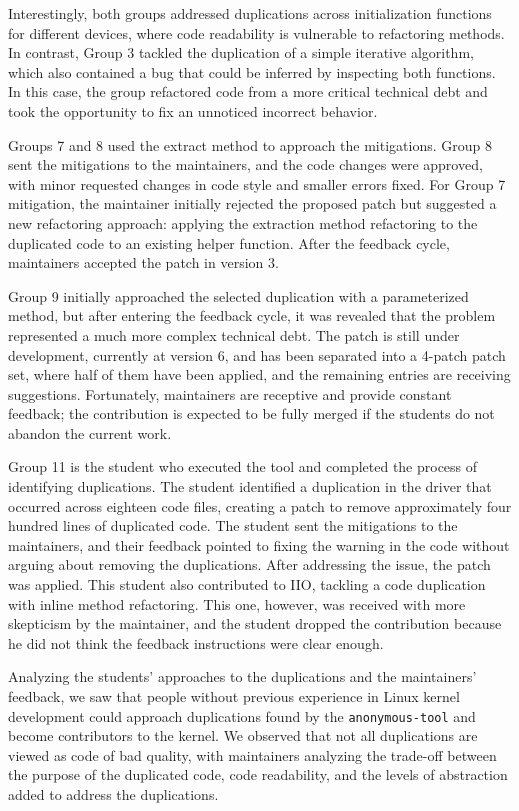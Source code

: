 \documentclass[10pt,conference]{IEEEtran}
\begin{document}
Interestingly, both groups addressed duplications across initialization functions for different devices, where code readability is vulnerable to refactoring methods. In contrast, Group 3 tackled the duplication of a simple iterative algorithm, which also contained a bug that could be inferred by inspecting both functions. In this case, the group refactored code from a more critical technical debt and took the opportunity to fix an unnoticed incorrect behavior.


Groups 7 and 8 used the extract method to approach the mitigations. Group 8 sent the mitigations to the maintainers, and the code changes were approved, with minor requested changes in code style and smaller errors fixed. For Group 7 mitigation, the maintainer initially rejected the proposed patch but suggested a new refactoring approach: applying the extraction method refactoring to the duplicated code to an existing helper function. After the feedback cycle, maintainers accepted the patch in version 3.

Group 9 initially approached the selected duplication with a parameterized method, but after entering the feedback cycle, it was revealed that the problem represented a much more complex technical debt. The patch is still under development, currently at version 6, and has been separated into a 4-patch patch set, where half of them have been applied, and the remaining entries are receiving suggestions. Fortunately, maintainers are receptive and provide constant feedback; the contribution is expected to be fully merged if the students do not abandon the current work.

Group 11 is the student who executed the tool and completed the process of identifying duplications. The student identified a duplication in the driver that occurred across eighteen code files, creating a patch to remove approximately four hundred lines of duplicated code. The student sent the mitigations to the maintainers, and their feedback pointed to fixing the warning in the code without arguing about removing the duplications. After addressing the issue, the patch was applied. This student also contributed to IIO, tackling a code duplication with inline method refactoring. This one, however, was received with more skepticism by the maintainer, and the student dropped the contribution because he did not think the feedback instructions were clear enough.

Analyzing the students' approaches to the duplications and the maintainers' feedback, we saw that people without previous experience in Linux kernel development could approach duplications found by the \texttt{anonymous-tool} and become contributors to the kernel. We observed that not all duplications 
are viewed as code of bad quality, with maintainers analyzing the trade-off between the purpose of the duplicated code, code readability, and the levels of abstraction added to address the duplications.
\end{document}
